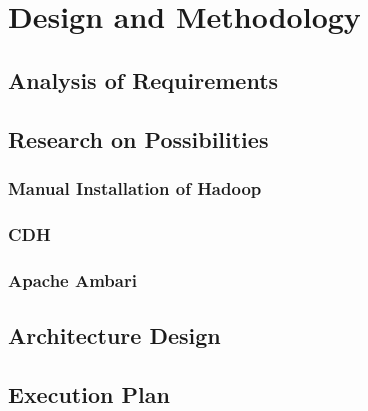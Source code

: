\chapter{Design and Methodology}
\label{chap:design}

\section{Analysis of Requirements}

\section{Research on Possibilities}

\subsection{Manual Installation of Hadoop}

\subsection{\acl{CDH}}

\subsection{Apache Ambari}

\section{Architecture Design}

\section{Execution Plan}
